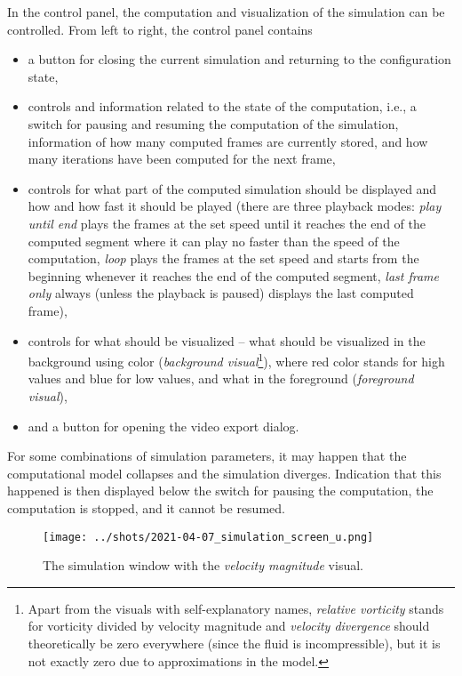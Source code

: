 \documentclass[11pt,a4paper,twoside,openright]{report}
\begin{document}
In the control panel, the computation and visualization of the simulation can be controlled. From left to right, the control panel contains
\begin{itemize}
	\item a button for closing the current simulation and returning to the configuration state,
	\item controls and information related to the state of the computation, i.e., a switch for pausing and resuming the computation of the simulation, information of how many computed frames are currently stored, and how many iterations have been computed for the next frame,
	\item controls for what part of the computed simulation should be displayed and how and how fast it should be played (there are three playback modes: \emph{play until end} plays the frames at the set speed until it reaches the end of the computed segment where it can play no faster than the speed of the computation, \emph{loop} plays the frames at the set speed and starts from the beginning whenever it reaches the end of the computed segment, \emph{last frame only} always (unless the playback is paused) displays the last computed frame),
	\item controls for what should be visualized -- what should be visualized in the background using color (\emph{background visual}\footnote{Apart from the visuals with self-explanatory names, \emph{relative vorticity} stands for vorticity divided by velocity magnitude and \emph{velocity divergence} should theoretically be zero everywhere (since the fluid is incompressible), but it is not exactly zero due to approximations in the model.}), where red color stands for high values and blue for low values, and what in the foreground (\emph{foreground visual}),
	\item and a button for opening the video export dialog.
\end{itemize}
For some combinations of simulation parameters, it may happen that the computational model collapses and the simulation diverges. Indication that this happened is then displayed below the switch for pausing the computation, the computation is stopped, and it cannot be resumed.

\begin{figure}[h]
	\centering
	\texttt{[image: ../shots/2021-04-07\_simulation\_screen\_u.png]}
	\caption{The simulation window with the \emph{velocity magnitude} visual.}
\end{figure}
\end{document}
